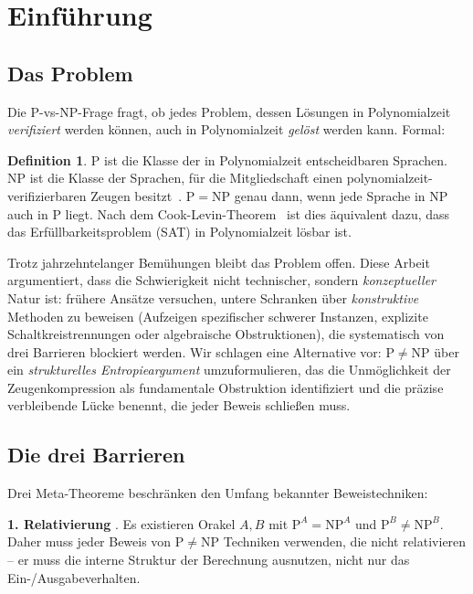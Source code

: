 \documentclass[aps,prd,twocolumn,superscriptaddress,nofootinbib]{revtex4-2}
\theoremstyle{definition}
\newtheorem{definition}[theorem]{Definition}
\theoremstyle{remark}
\newcommand{\NP}{\mathrm{NP}}
\newcommand{\PP}{\mathrm{P}}
\begin{document}
\section{Einführung}
\label{sec:intro}

\subsection{Das Problem}

Die $\PP$-vs-$\NP$-Frage fragt, ob jedes Problem, dessen Lösungen in Polynomialzeit \textit{verifiziert} werden können, auch in Polynomialzeit \textit{gelöst} werden kann. Formal:

\begin{definition}
$\PP$ ist die Klasse der in Polynomialzeit entscheidbaren Sprachen. $\NP$ ist die Klasse der Sprachen, für die Mitgliedschaft einen polynomialzeit-verifizierbaren Zeugen besitzt~\cite{Arora2009}. $\PP = \NP$ genau dann, wenn jede Sprache in $\NP$ auch in $\PP$ liegt. Nach dem Cook-Levin-Theorem~\cite{Cook1971} ist dies äquivalent dazu, dass das Erfüllbarkeitsproblem (SAT) in Polynomialzeit lösbar ist.
\end{definition}

Trotz jahrzehntelanger Bemühungen bleibt das Problem offen. Diese Arbeit argumentiert, dass die Schwierigkeit nicht technischer, sondern \textit{konzeptueller} Natur ist: frühere Ansätze versuchen, untere Schranken über \textit{konstruktive} Methoden zu beweisen (Aufzeigen spezifischer schwerer Instanzen, explizite Schaltkreistrennungen oder algebraische Obstruktionen), die systematisch von drei Barrieren blockiert werden. Wir schlagen eine Alternative vor: $\PP \neq \NP$ über ein \textit{strukturelles Entropieargument} umzuformulieren, das die Unmöglichkeit der Zeugenkompression als fundamentale Obstruktion identifiziert und die präzise verbleibende Lücke benennt, die jeder Beweis schließen muss.

\subsection{Die drei Barrieren}

Drei Meta-Theoreme beschränken den Umfang bekannter Beweistechniken:

\textbf{1. Relativierung} \cite{BakerGillSolovay1975}. Es existieren Orakel $A, B$ mit $\PP^A = \NP^A$ und $\PP^B \neq \NP^B$. Daher muss jeder Beweis von $\PP \neq \NP$ Techniken verwenden, die nicht relativieren -- er muss die interne Struktur der Berechnung ausnutzen, nicht nur das Ein-/Ausgabeverhalten.
\end{document}
